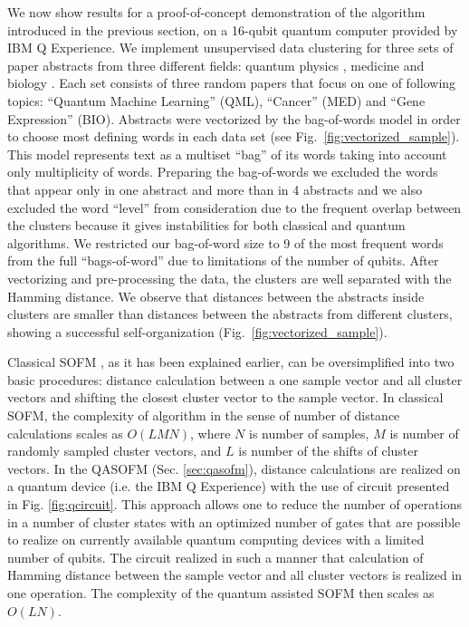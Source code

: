 \documentclass[pra,showkeys,twocolumn,showpacs]{revtex4-1}
\begin{document}
We now show results for a proof-of-concept demonstration of the algorithm introduced in the previous section, on a 16-qubit quantum computer provided by IBM Q Experience.  
We implement unsupervised data clustering for three sets of paper abstracts from three different fields: quantum physics \cite{qml0, qml1, qml2}, medicine \cite{med0, med1, med2} and biology \cite{bio0, bio1, bio2}. 
Each set consists of three random papers that focus on one of following topics: ``Quantum Machine Learning'' (QML), ``Cancer'' (MED) and ``Gene Expression'' (BIO). 
Abstracts were vectorized by the bag-of-words model in order to choose most defining words in each data set (see Fig.~\ref{fig:vectorized_sample}). 
This model represents text as a multiset ``bag'' of its words taking into account only multiplicity of words. 
Preparing the bag-of-words we excluded the words that appear only in one abstract and more than in 4 abstracts and we also excluded the word ``level'' from consideration due to the frequent overlap between the clusters because it gives instabilities for both classical and quantum algorithms. 
We restricted our bag-of-word size to 9 of the most frequent words from the full ``bags-of-word''  due to limitations of the number of qubits. 
After vectorizing and pre-processing  the data, the clusters are well separated with the Hamming distance.  
We observe that distances between the abstracts inside clusters are smaller than distances between the abstracts from different clusters, showing a successful self-organization (Fig.~\ref{fig:vectorized_sample}). 


Classical SOFM \cite{kohonen1990}, as it has been explained earlier, can be oversimplified into two basic procedures: distance calculation between a one sample vector and all cluster vectors and shifting the closest cluster vector to the sample vector. 
In classical SOFM, the complexity of algorithm in the sense of number of distance calculations scales as $O(LMN)$, where $N$ is number of samples, $M$ is number of randomly sampled cluster vectors, and $L$ is number of the shifts of cluster vectors.  
In the QASOFM (Sec. \ref{sec:qasofm}), distance calculations are realized on a quantum device (i.e. the IBM Q Experience) with the use of circuit presented in Fig. \ref{fig:qcircuit}. 
This approach allows one to reduce the number of operations in a number of cluster states with an optimized number of gates that are possible to realize on currently available quantum computing devices with a limited number of qubits. 
The circuit realized in such a manner that calculation of Hamming distance between the sample vector and all cluster vectors is realized in one operation. 
The complexity of the quantum assisted SOFM then scales as $O(LN)$. 
\end{document}
